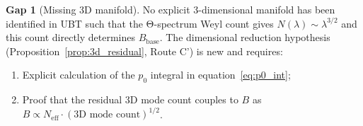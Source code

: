\documentclass[11pt,a4paper]{article}
\theoremstyle{definition}
\newtheorem{gap}{Gap}
\theoremstyle{remark}
\begin{document}
\begin{gap}[Missing 3D manifold]
\label{gap:3d_manifold}
  No explicit 3-dimensional manifold has been identified in UBT such that
  the Θ-spectrum Weyl count gives $N(\lambda) \sim \lambda^{3/2}$ and
  this count directly determines $B_{\mathrm{base}}$.
  The dimensional reduction hypothesis (Proposition~\ref{prop:3d_residual},
  Route C') is new and requires:
  \begin{enumerate}
    \item Explicit calculation of the $p_0$ integral in equation~\eqref{eq:p0_int};
    \item Proof that the residual 3D mode count couples to $B$ as
      $B \propto N_{\mathrm{eff}} \cdot (\text{3D mode count})^{1/2}$.
  \end{enumerate}
\end{gap}

\ifdefined\INCLUDEMODE\else
\end{document}
